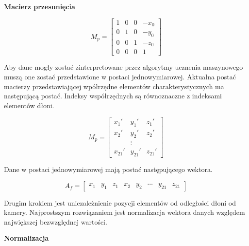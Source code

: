     \quad \textbf{Macierz przesunięcia}
    
    \begin{equation*}
        M_p = 
        \begin{bmatrix}
        1 & 0 & 0 & -x_0 \\
        0 & 1 & 0 & -y_0 \\
        0 & 0 & 1 & -z_0 \\
        0 & 0 & 0 & 1
        \end{bmatrix}
    \end{equation*}
    
    \quad Aby dane mogły zostać zinterpretowane przez algorytmy ucznenia maszynowego muszą one zostać przedstawione w postaci jednowymiarowej. Aktualna postać macierzy przedstawiającej wpółrzędne elementów charakterystycznych ma następującą postać. Indeksy współrzędnych są równoznaczne z indeksami elementów dłoni. 
    
    \begin{equation*}
        M_p = 
        \begin{bmatrix}
        x_1' & y_1' & z_1' \\
        x_2' & y_2' & z_2' \\
         & \vdots &     \\
        x_{21}' & y_{21}' & z_{21}'
        \end{bmatrix}
    \end{equation*}
    
    Dane w postaci jednowymiarowej mają postać następującego wektora. 
    
    \begin{equation*}
        A_f=
        \begin{bmatrix}
            x_1 & y_1 & z_1 & x_2 & y_2 & \cdots & y_{21} & z_{21}
        \end{bmatrix}
    \end{equation*}
    
    
    \quad Drugim krokiem jest uniezależnienie pozycji elementów od odległości dłoni od kamery. Najprostszym rozwiązaniem jest normalizacja wektora danych względem największej bezwzględnej wartości. 
    
    \quad \textbf{Normalizacja}
    
    
